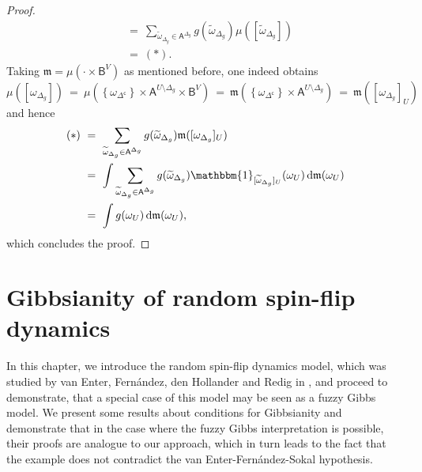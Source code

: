 \documentclass[12pt]{article}
\renewcommand{\AA}{\mathsf{A}}
\newcommand{\AB}{\mathsf{B}}
\renewcommand{\d}{\mathrm{d}}
\newcommand{\set}[1]{\left\{#1\right\}}
\newcommand{\pika}{\boldsymbol{\cdot}}
\newcommand{\1}{\mathbbm{1}}
\renewcommand{\c}{\mathsf{c}}
\newcommand{\5}{\vspace{0.5cm}}
\renewcommand{\tilde}{\widetilde}
\theoremstyle{definition}
\begin{document}
\begin{proof}
\begin{align*}
&=~ \sum_{\tilde{\omega}_{\Delta_g}\in\AA^{\Delta_g}}g(\tilde{\omega}_{\Delta_g})\mu([\tilde{\omega}_{\Delta_g}]) \\
&=~ (*).
\end{align*}
Taking $\mathfrak{m}=\mu(\pika\times\AB^V)$ as mentioned before, one indeed obtains
$$\mu([\omega_{\Delta_g}]) ~=~ \mu(\set{\omega_{\Delta^\c}}\times\AA^{U\setminus\Delta_g}\times\AB^{V}) ~=~ \mathfrak{m}(\set{\omega_{\Delta^\c}}\times\AA^{U\setminus\Delta_g}) ~=~ \mathfrak{m}([\omega_{\Delta_g}]_U)$$
and hence
\begin{align*}
(*) ~&=~ \sum_{\tilde{\omega}_{\Delta_g}\in\AA^{\Delta_g}}g(\tilde{\omega}_{\Delta_g})\mathfrak{m}([\omega_{\Delta_g}]_U) \\
&=~ \int \sum_{\tilde{\omega}_{\Delta_g}\in\AA^{\Delta_g}}g(\tilde{\omega}_{\Delta_g})\1_{[\tilde{\omega}_{\Delta_g}]_U}(\omega_U)\,\d\mathfrak{m}(\omega_U) \\
&=~ \int g(\omega_U)\,\d\mathfrak{m}(\omega_U),
\end{align*}
which concludes the proof.

\end{proof}


\pagebreak


\section{Gibbsianity of random spin-flip dynamics}\label{ch:4}

In this chapter, we introduce the random spin-flip dynamics model, which was studied by van Enter, Fern\'andez, den Hollander and Redig in \cite{EFHR}, and proceed to demonstrate, that a special case of this model may be seen as a fuzzy Gibbs model. We present some results about conditions for Gibbsianity and demonstrate that in the case where the fuzzy Gibbs interpretation is possible, their proofs are analogue to our approach, which in turn leads to the fact that the example does not contradict the van Enter-Fern\'andez-Sokal hypothesis.

\end{document}
